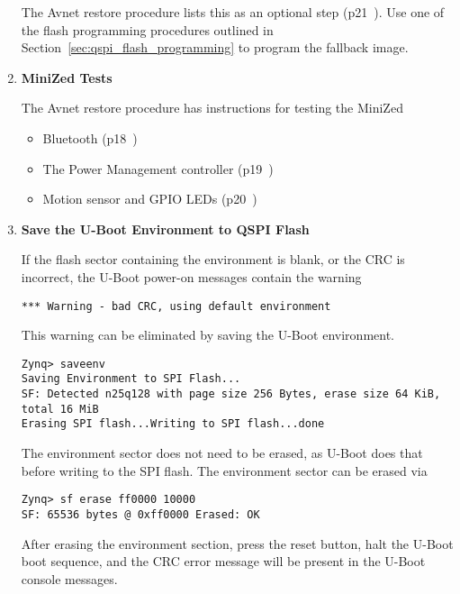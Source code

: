 \begin{enumerate}
The Avnet restore procedure lists this as an optional step
(p21~\cite{Avnet_MiniZed_Restore_2018}).
Use one of the flash programming procedures outlined in
Section~\ref{sec:qspi_flash_programming} to program the fallback image.

\item \textbf{MiniZed Tests}

The Avnet restore procedure has instructions for testing the MiniZed
%
\begin{itemize}
\item Bluetooth (p18~\cite{Avnet_MiniZed_Restore_2018})
\item The Power Management controller (p19~\cite{Avnet_MiniZed_Restore_2018})
\item Motion sensor and GPIO LEDs (p20~\cite{Avnet_MiniZed_Restore_2018})
\end{itemize}

\newpage
\item \textbf{Save the U-Boot Environment to QSPI Flash}

If the flash sector containing the environment is blank, or the CRC
is incorrect, the U-Boot power-on messages contain the warning
%
\begin{verbatim}
*** Warning - bad CRC, using default environment
\end{verbatim}
%
This warning can be eliminated by saving the U-Boot environment.
%
\begin{verbatim}
Zynq> saveenv
Saving Environment to SPI Flash...
SF: Detected n25q128 with page size 256 Bytes, erase size 64 KiB, total 16 MiB
Erasing SPI flash...Writing to SPI flash...done
\end{verbatim}
%
The environment sector does not need to be erased, as U-Boot does that
before writing to the SPI flash. The environment sector can be erased via
%
\begin{verbatim}
Zynq> sf erase ff0000 10000
SF: 65536 bytes @ 0xff0000 Erased: OK
\end{verbatim}
%
After erasing the environment section, press the reset button, halt the U-Boot boot
sequence, and the CRC error message will be present in the U-Boot console
messages.
\end{enumerate}
